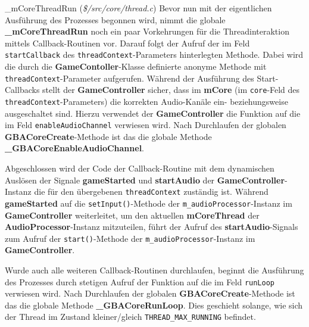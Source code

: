 \documentclass[11pt,a4paper]{scrartcl}
\newcommand{\AutorDominik} {
    \vspace{-4mm}
    \large \textbf{Autor:} Dominik Scharnagl \normalsize
    \vspace{2mm}
}
\begin{document}
\newpage

\vspace{5mm}
\large {\_}mCoreThreadRun \normalsize(\textit{\$/src/core/thread.c})
\vspace{2mm}\newline
Bevor nun mit der eigentlichen Ausf\"uhrung des Prozesses begonnen wird, nimmt die globale \textbf{{\_}mCoreThreadRun} noch ein paar Vorkehrungen f\"ur die Threadinteraktion mittels Callback-Routinen vor. Darauf folgt der Aufruf der im Feld \verb|startCallback| des \verb|threadContext|-Parameters hinterlegten Methode. Dabei wird die durch die \textbf{GameContoller}-Klasse definierte anonyme Methode mit \verb|threadContext|-Parameter aufgerufen. W\"ahrend der Ausf\"uhrung des Start-Callbacks stellt der \textbf{GameController} sicher, dass im \textbf{mCore} (im \verb|core|-Feld des \verb|threadContext|-Parameters) die korrekten Audio-Kan\"ale ein- beziehungsweise ausgeschaltet sind. Hierzu verwendet der \textbf{GameController} die Funktion auf die im Feld \verb|enableAudioChannel| verwiesen wird. Nach Durchlaufen der globalen \textbf{GBACoreCreate}-Methode ist das die globale Methode \textbf{{\_}GBACoreEnableAudioChannel}.

Abgeschlossen wird der Code der Callback-Routine mit dem dynamischen Ausl\"osen der Signale \textbf{gameStarted} und \textbf{startAudio} der \textbf{GameController}-Instanz die f\"ur den \"ubergebenen \verb|threadContext| zust\"andig ist. W\"ahrend \textbf{gameStarted} auf die \verb|setInput()|-Methode der \verb|m_audioProcessor|-Instanz im \textbf{GameController} weiterleitet, um den aktuellen \textbf{mCoreThread} der \textbf{AudioProcessor}-Instanz mitzuteilen, f\"uhrt der Aufruf des \textbf{startAudio}-Signals zum Aufruf der \verb|start()|-Methode der \verb|m_audioProcessor|-Instanz im \textbf{GameController}.

Wurde auch alle weiteren Callback-Routinen durchlaufen, beginnt die Ausf\"uhrung des Prozesses durch stetigen Aufruf der Funktion auf die im Feld \verb|runLoop| verwiesen wird. Nach Durchlaufen der globalen \textbf{GBACoreCreate}-Methode ist das die globale Methode \textbf{{\_}GBACoreRunLoop}. Dies geschieht solange, wie sich der Thread im Zustand kleiner/gleich \verb|THREAD_MAX_RUNNING| befindet.


\end{document}
